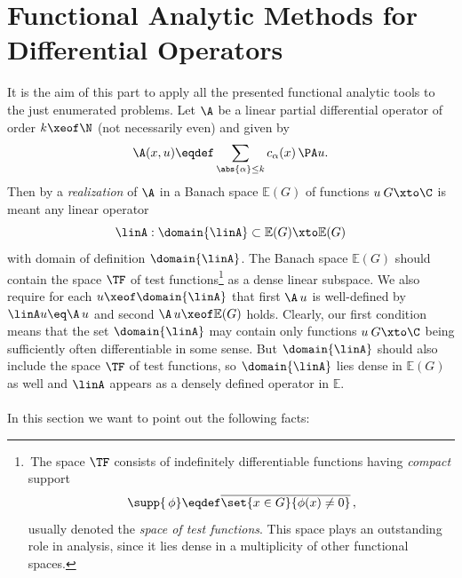 \documentclass[11pt,twoside]{article}
\def\G{G}
\begin{document}
\section{Functional Analytic Methods for Differential Operators}
It is the aim of this part to apply
all the presented functional analytic tools to the just enumerated problems.
Let $\A$ be a linear partial differential operator of order $k \xeof \N$
(not necessarily even) and given by
\begin{equation}\label{XII_ANY_ORDER_LPDO}
\A(x,u) \eqdef
\sum_{\abs{\alpha} \leq k} c_{\alpha}(x) \, \PA u.
\end{equation}
Then by a \textit{realization} of $\A$ in a Banach space $\mathbb{E}(\G)$
of functions $u \: \G \xto \C$ is meant any linear operator
\[
\linA: \domain{\linA} \subset \mathbb{E}(G) \xto \mathbb{E}(G)
\]
with domain of definition $\domain{\linA}$.
The Banach space $\mathbb{E}(\G)$ should contain the space $\TF$ 
of test functions\footnote{
\,The space $\TF$ consists of indefinitely differentiable functions
having \textit{compact} support
\[
\supp{\,\phi} \eqdef \overline{\set{x \in \G}{\phi(x) \neq 0}}\,,
\]
usually denoted the \textit{space of test functions}.
This space plays an out\-standing role in analysis,
since it lies dense in a multiplicity of other functional spaces.}
as a dense linear subspace.
We also require for each $u \xeof \domain{\linA}$ that
first $\A \, u$ is well-defined by
$\linA u \eq \A \, u$ and second
$\A \, u \xeof \mathbb{E}(\G)$ holds.
Clearly,
our first condition means that the set $\domain{\linA}$
may contain only functions $u \: \G \xto \C$ being sufficiently often
differentiable in some sense.
But $\domain{\linA}$ should also include the space $\TF$ of test functions,
so $\domain{\linA}$ lies dense in $\mathbb{E}(\G)$ as well 
and $\linA$ appears as a densely defined operator in $\mathbb{E}$.

\paragraph{} %
In this section we want to point out the following facts:
\end{document}
